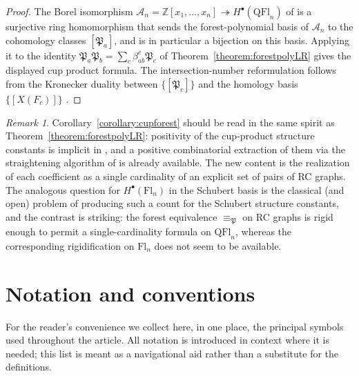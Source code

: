 \documentclass{amsart}
\theoremstyle{definition}
\theoremstyle{remark}
\newtheorem*{remark}{Remark}
\numberwithin{equation}{subsection}
\newcommand{\coma}{\mathcal{A}}
\newcommand{\forest}{\mathfrak{P}}
\begin{document}
\begin{proof}
The Borel isomorphism $\coma_n=\mathbb{Z}[x_1,\ldots,x_n]\twoheadrightarrow H^\bullet(\mathrm{QFl}_n)$ of \cite[Theorem~A and Corollary~12.5]{bergeron2025qsymflag} is a surjective ring homomorphism that sends the forest-polynomial basis of $\coma_n$ to the cohomology classes $[\forest_a]$, and is in particular a bijection on this basis. Applying it to the identity $\forest_a\forest_b = \sum_c \beta_{ab}^c \forest_c$ of Theorem~\ref{theorem:forestpolyLR} gives the displayed cup product formula. The intersection-number reformulation follows from the Kronecker duality between $\{[\forest_c]\}$ and the homology basis $\{[X(F_c)]\}$ \cite[Theorem~12.12]{bergeron2025qsymflag}.
\end{proof}

\begin{remark}
Corollary~\ref{corollary:cupforest} should be read in the same spirit as Theorem~\ref{theorem:forestpolyLR}: positivity of the cup-product structure constants is implicit in \cite{bergeron2025equivariant,bergeron2025qsymflag}, and a positive combinatorial extraction of them via the straightening algorithm of \cite{bergeron2025equivariant} is already available. The new content is the realization of each coefficient as a single cardinality of an explicit set of pairs of RC graphs. The analogous question for $H^\bullet(\mathrm{Fl}_n)$ in the Schubert basis is the classical (and open) problem of producing such a count for the Schubert structure constants, and the contrast is striking: the forest equivalence $\equiv_\forest$ on RC graphs is rigid enough to permit a single-cardinality formula on $\mathrm{QFl}_n$, whereas the corresponding rigidification on $\mathrm{Fl}_n$ does not seem to be available.
\end{remark}


\section*{Notation and conventions}\label{section:notation}

For the reader's convenience we collect here, in one place, the principal symbols used throughout the article. All notation is introduced in context where it is needed; this list is meant as a navigational aid rather than a substitute for the definitions.

\begingroup
{}
\end{document}
